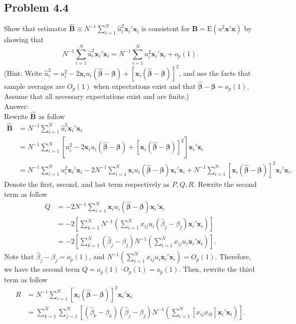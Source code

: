 \documentclass[10pt]{article}
\newcommand{\E}{\text{E}}
\begin{document}
\subsection*{Problem 4.4}
Show that estimator $\hat{\mathbf{B}}\equiv N^{-1} \sum_{i=1}^{N}\hat{u}_i^2 \mathbf{x}_i'\mathbf{x}_i$ is consistent for $\mathbf{B}=\E(u^2\mathbf{x}'\mathbf{x})$ by showing that 
\[N^{-1} \sum_{i=1}^{N}\hat{u}_i^2 \mathbf{x}_i'\mathbf{x}_i=N^{-1} \sum_{i=1}^{N}u_i^2 \mathbf{x}_i'\mathbf{x}_i+o_p(1).\]
(Hint: Write $\hat{u}_i^2=u_i^2-2\mathbf{x}_i u_i (\pmb{\hat{\beta}}-\pmb{\beta})+[\mathbf{x}_i (\pmb{\hat{\beta}}-\pmb{\beta})]^2$, and use the facts that sample averages are $O_p(1)$ when expectations exist and that $\pmb{\hat{\beta}}-\pmb{\beta}=o_p(1).$ Assume that all necessary expectations exist and are finite.)
\\ Answer:\\
Rewrite $\hat{\mathbf{B}}$ as follow
\begin{align*}
    \hat{\mathbf{B}}&= N^{-1} \sum_{i=1}^{N}\hat{u}_i^2 \mathbf{x}_i'\mathbf{x}_i \\
    &=N^{-1} \sum_{i=1}^{N}\left[u_i^2-2\mathbf{x}_i u_i (\pmb{\hat{\beta}}-\pmb{\beta})+[\mathbf{x}_i (\pmb{\hat{\beta}}-\pmb{\beta})]^2\right] \mathbf{x}_i'\mathbf{x}_i \\
    &=N^{-1} \sum_{i=1}^{N}u_i^2 \mathbf{x}_i'\mathbf{x}_i
    -2N^{-1} \sum_{i=1}^{N}\mathbf{x}_i u_i (\pmb{\hat{\beta}}-\pmb{\beta})\mathbf{x}_i'\mathbf{x}_i
    +N^{-1} \sum_{i=1}^{N}[\mathbf{x}_i (\pmb{\hat{\beta}}-\pmb{\beta})]^2 \mathbf{x}_i'\mathbf{x}_i.
\end{align*}
Denote the first, second, and last term respectively as $P, Q, R$. Rewrite the second term as follow
\begin{align*}
    Q&=-2N^{-1} \sum_{i=1}^{N}\mathbf{x}_i u_i (\pmb{\hat{\beta}}-\pmb{\beta})\mathbf{x}_i'\mathbf{x}_i\\
    &=-2\left[\sum_{k=1}^{N}N^{-1}\left(\sum_{i=1}^{N}x_{ij}u_i (\hat{\beta}_j-\beta_j)\mathbf{x}_i'\mathbf{x}_i\right)\right]\\
    &=-2\left[\sum_{k=1}^{N}(\hat{\beta}_j-\beta_j)N^{-1}\left(\sum_{i=1}^{N}x_{ij}u_i \mathbf{x}_i'\mathbf{x}_i\right)\right].
\end{align*}
Note that $\hat{\beta}_j-\beta_j=o_p(1)$, and $N^{-1}\left(\sum_{i=1}^{N}x_{ij}u_i \mathbf{x}_i'\mathbf{x}_i\right)=O_p(1).$ Therefore, we have the second term $Q=o_p(1)\cdot O_p(1)=o_p(1).$
Then, rewrite the third term as follow
\begin{align*}
    R&=N^{-1} \sum_{i=1}^{N}[\mathbf{x}_i (\pmb{\hat{\beta}}-\pmb{\beta})]^2 \mathbf{x}_i'\mathbf{x}_i\\
    &=\sum_{k=1}^{N}\sum_{j=1}^{N}\left[(\hat{\beta}_k-\beta_k)(\hat{\beta}_j-\beta_j)N^{-1}\left(\sum_{i=1}^{N}[x_{ij}x_{ik}] \mathbf{x}_i'\mathbf{x}_i\right)\right].
\end{align*}
\end{document}
